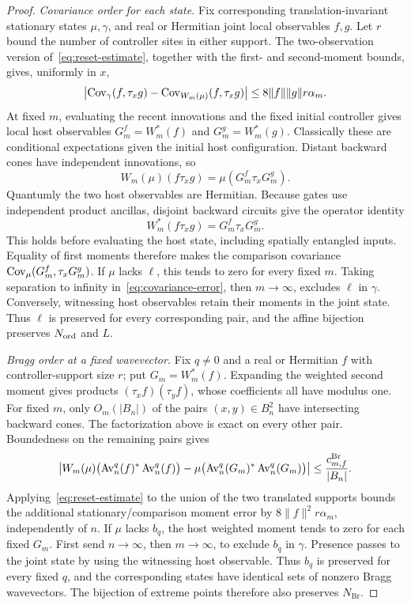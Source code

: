 \begin{proof}
\emph{Covariance order for each state.}
Fix corresponding translation-invariant stationary states
\(\mu,\gamma\), and real or Hermitian joint local observables \(f,g\).
Let \(r\) bound the number of controller sites in either support.
The two-observation version of~\eqref{eq:reset-estimate}, together
with the first- and second-moment bounds, gives, uniformly in \(x\),
\begin{equation}\label{eq:covariance-error}
 \left|\operatorname{Cov}_\gamma(f,\tau_xg)
       -\operatorname{Cov}_{W_m(\mu)}(f,\tau_xg)\right|
 \le 8\|f\|\|g\|r\alpha_m.
\end{equation}
At fixed \(m\), evaluating the recent innovations and the fixed
initial controller gives local host observables
\(G_m^f=W_m^*(f)\) and \(G_m^g=W_m^*(g)\).
Classically these are conditional expectations given the initial
host configuration. Distant backward cones have independent
innovations, so
\[
 W_m(\mu)(f\tau_xg)=\mu(G_m^f\tau_xG_m^g).
\]
Quantumly the two host observables are Hermitian. Because gates
use independent product ancillas, disjoint backward circuits give
the operator identity
\[
 W_m^*(f\tau_xg)=G_m^f\tau_xG_m^g.
\]
This holds before evaluating the host state, including spatially
entangled inputs. Equality of first moments therefore makes the
comparison covariance \(\operatorname{Cov}_\mu(G_m^f,\tau_xG_m^g)\).
If \(\mu\) lacks \(\ell\), this tends to zero for every fixed
\(m\). Taking separation to infinity in~\eqref{eq:covariance-error},
then \(m\to\infty\), excludes \(\ell\) in \(\gamma\).
Conversely, witnessing host observables retain their moments in
the joint state. Thus \(\ell\) is preserved for every corresponding
pair, and the affine bijection preserves \(N_{\mathrm{ord}}\) and \(L\).

\emph{Bragg order at a fixed wavevector.}
Fix \(q\ne0\) and a real or Hermitian \(f\) with controller-support size \(r\); put \(G_m=W_m^*(f)\). Expanding the weighted
second moment gives products \((\tau_xf)(\tau_yf)\), whose
coefficients all have modulus one.  For fixed \(m\), only
\(O_m(|B_n|)\) of the pairs \((x,y)\in B_n^2\) have intersecting
backward cones.  The factorization above is exact on every other
pair.  Boundedness on the remaining pairs gives
\[
 \left|W_m(\mu)\bigl(\operatorname{Av}_n^q(f)^*\operatorname{Av}_n^q(f)\bigr)
       -\mu\bigl(\operatorname{Av}_n^q(G_m)^*\operatorname{Av}_n^q(G_m)\bigr)\right|
 \le \frac{c^{\mathrm{Br}}_{m,f}}{|B_n|}.
\]
Applying~\eqref{eq:reset-estimate} to the union of the two translated
supports bounds the additional stationary/comparison moment error
by \(8\|f\|^2r\alpha_m\), independently of \(n\).  If \(\mu\) lacks
\(b_q\), the host weighted moment tends to zero for each fixed
\(G_m\).  First send \(n\to\infty\), then \(m\to\infty\), to
exclude \(b_q\) in \(\gamma\).  Presence passes to the joint state
by using the witnessing host observable.  Thus \(b_q\) is preserved
for every fixed \(q\), and the corresponding states have identical
sets of nonzero Bragg wavevectors.  The bijection of extreme points
therefore also preserves \(N_{\mathrm{Br}}\).
\end{proof}





